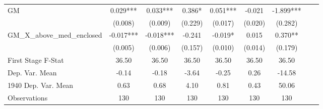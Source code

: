 \begin{tabular}{l*{8}{c}}
\cmidrule(lr){1-7}
GM              &    0.029***&    0.033***&    0.386*  &    0.051***&   -0.021   &   -1.899***\\
                &  (0.008)   &  (0.009)   &  (0.229)   &  (0.017)   &  (0.020)   &  (0.282)   \\
\addlinespace
GM\_X\_above\_med\_enclosed&   -0.017***&   -0.018***&   -0.241   &   -0.019*  &    0.015   &    0.370** \\
                &  (0.005)   &  (0.006)   &  (0.157)   &  (0.010)   &  (0.014)   &  (0.179)   \\
\midrule
First Stage F-Stat&    36.50   &    36.50   &    36.50   &    36.50   &    36.50   &    36.50   \\
Dep. Var. Mean  &    -0.14   &    -0.18   &    -3.64   &    -0.25   &     0.26   &   -14.58   \\
1940 Dep. Var. Mean&     0.63   &     0.68   &     4.10   &     0.81   &     0.43   &    50.06   \\
Observations    &      130   &      130   &      130   &      130   &      130   &      130   \\
       \bottomrule \end{tabular}
